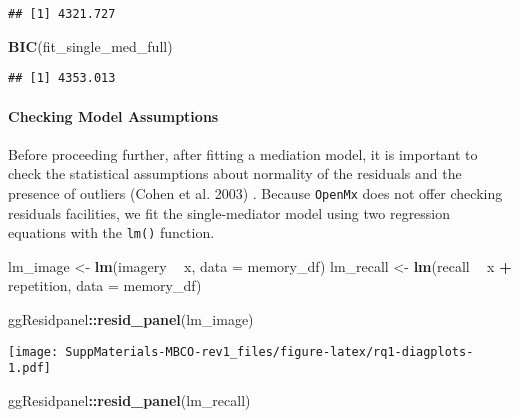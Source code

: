 \documentclass[11pt,]{article}
\newenvironment{Shaded}{\begin{snugshade}}{\end{snugshade}}
\newcommand{\DataTypeTok}[1]{\textcolor[rgb]{0.13,0.29,0.53}{#1}}
\newcommand{\KeywordTok}[1]{\textcolor[rgb]{0.13,0.29,0.53}{\textbf{#1}}}
\newcommand{\NormalTok}[1]{#1}
\newcommand{\OperatorTok}[1]{\textcolor[rgb]{0.81,0.36,0.00}{\textbf{#1}}}
\newcommand{\StringTok}[1]{\textcolor[rgb]{0.31,0.60,0.02}{#1}}
\let\oldparagraph\paragraph
\renewcommand{\paragraph}[1]{\oldparagraph{#1}\mbox{}}
\begin{document}
\begin{verbatim}
## [1] 4321.727
\end{verbatim}

\begin{Shaded}
\begin{Highlighting}[]
\KeywordTok{BIC}\NormalTok{(fit_single_med_full)}
\end{Highlighting}
\end{Shaded}

\begin{verbatim}
## [1] 4353.013
\end{verbatim}

\hypertarget{checking-model-assumptions}{%
\paragraph{Checking Model
Assumptions}\label{checking-model-assumptions}}

Before proceeding further, after fitting a mediation model, it is
important to check the statistical assumptions about normality of the
residuals and the presence of outliers (Cohen et al. 2003) . Because
\texttt{OpenMx} does not offer checking residuals facilities, we fit the
single-mediator model using two regression equations with the
\texttt{lm()} function.

\begin{Shaded}
\begin{Highlighting}[]
\NormalTok{lm_image <-}\StringTok{ }\KeywordTok{lm}\NormalTok{(imagery }\OperatorTok{~}\StringTok{ }\NormalTok{x, }\DataTypeTok{data =}\NormalTok{ memory_df)}
\NormalTok{lm_recall <-}\StringTok{ }\KeywordTok{lm}\NormalTok{(recall }\OperatorTok{~}\StringTok{ }\NormalTok{x }\OperatorTok{+}\StringTok{ }\NormalTok{repetition, }\DataTypeTok{data =}\NormalTok{ memory_df)}
\end{Highlighting}
\end{Shaded}

\begin{Shaded}
\begin{Highlighting}[]
\NormalTok{ggResidpanel}\OperatorTok{::}\KeywordTok{resid_panel}\NormalTok{(lm_image)}
\end{Highlighting}
\end{Shaded}

\texttt{[image: SuppMaterials-MBCO-rev1\_files/figure-latex/rq1-diagplots-1.pdf]}

\begin{Shaded}
\begin{Highlighting}[]
\NormalTok{ggResidpanel}\OperatorTok{::}\KeywordTok{resid_panel}\NormalTok{(lm_recall)}
\end{Highlighting}
\end{Shaded}
\end{document}
